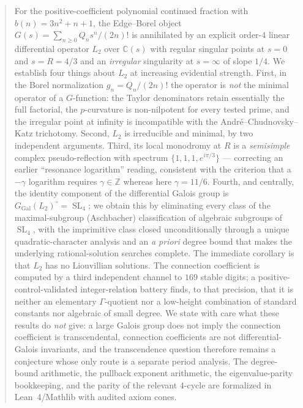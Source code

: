 \documentclass[11pt,reqno]{amsart}
\theoremstyle{plain}
\theoremstyle{definition}
\theoremstyle{remark}
\newcommand{\C}{\mathbb{C}}
\newcommand{\Z}{\mathbb{Z}}
\newcommand{\GGal}{G_{\mathrm{Gal}}}
\newcommand{\SL}{\operatorname{SL}}
\newcommand{\Ltwo}{L_{2}}
\begin{document}
\begin{abstract}
For the positive-coefficient polynomial continued fraction with
$b(n)=3n^{2}+n+1$, the Edge--Borel object $G(s)=\sum_{n\ge0}Q_{n}s^{n}/(2n)!$
is annihilated by an explicit order-$4$ linear differential operator $\Ltwo$
over $\C(s)$ with regular singular points at $s=0$ and $s=R=4/3$ and an
\emph{irregular} singularity at $s=\infty$ of slope $1/4$. We establish four
things about $\Ltwo$ at increasing evidential strength. First, in the Borel
normalization $g_{n}=Q_{n}/(2n)!$ the operator is \emph{not} the minimal
operator of a $G$-function: the Taylor denominators retain essentially the
full factorial, the $p$-curvature is non-nilpotent for every tested prime,
and the irregular point at infinity is incompatible with the
Andr\'e--Chudnovsky--Katz trichotomy. Second, $\Ltwo$ is irreducible and
minimal, by two independent arguments. Third, its local monodromy at $R$ is a
\emph{semisimple} complex pseudo-reflection with spectrum
$\{1,1,1,e^{i\pi/3}\}$ --- correcting an earlier ``resonance logarithm''
reading, consistent with the criterion that a $-\gamma$ logarithm requires
$\gamma\in\Z$ whereas here $\gamma=11/6$. Fourth, and centrally, the identity
component of the differential Galois group is
$\GGal(\Ltwo)^{\circ}=\SL_{4}$; we obtain this by eliminating every class of
the maximal-subgroup (Aschbacher) classification of algebraic subgroups of
$\SL_{4}$, with the imprimitive class closed unconditionally through a unique
quadratic-character analysis and an \emph{a priori} degree bound that makes
the underlying rational-solution searches complete. The immediate corollary is
that $\Ltwo$ has no Liouvillian solutions. The connection coefficient is
computed by a third independent channel to $169$ stable digits; a
positive-control-validated integer-relation battery finds, to that precision,
that it is neither an elementary $\Gamma$-quotient nor a low-height
combination of standard constants nor algebraic of small degree. We state with
care what these results do \emph{not} give: a large Galois group does not
imply the connection coefficient is transcendental, connection coefficients
are not differential-Galois invariants, and the transcendence question
therefore remains a conjecture whose only route is a separate period analysis.
The degree-bound arithmetic, the pullback exponent arithmetic, the
eigenvalue-parity bookkeeping, and the parity of the relevant $4$-cycle are
formalized in Lean~4/Mathlib with audited axiom cones.
\end{abstract}
\end{document}
